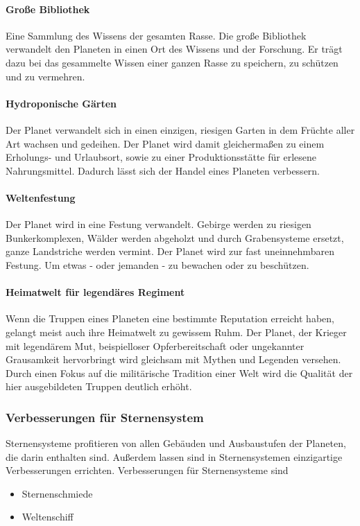 \documentclass[11pt, a4paper]{article}
\begin{document}
\paragraph{Große Bibliothek}
Eine Sammlung des Wissens der gesamten Rasse. Die große Bibliothek verwandelt den Planeten in einen Ort des
Wissens und der Forschung. Er trägt dazu bei das gesammelte Wissen einer ganzen Rasse zu speichern, zu schützen
und zu vermehren.
%
\paragraph{Hydroponische Gärten}
Der Planet verwandelt sich in einen einzigen, riesigen Garten in dem Früchte aller Art wachsen und gedeihen.
Der Planet wird damit gleichermaßen zu einem Erholungs- und Urlaubsort, sowie zu einer Produktionsstätte für
erlesene Nahrungsmittel. Dadurch lässt sich der Handel eines Planeten verbessern.
%
\paragraph{Weltenfestung}
Der Planet wird in eine Festung verwandelt. Gebirge werden zu riesigen Bunkerkomplexen, Wälder werden abgeholzt
und durch Grabensysteme ersetzt, ganze Landstriche werden vermint. Der Planet wird zur fast uneinnehmbaren
Festung. Um etwas - oder jemanden - zu bewachen oder zu beschützen.
%
\paragraph{Heimatwelt für legendäres Regiment}
Wenn die Truppen eines Planeten eine bestimmte Reputation erreicht haben, gelangt meist auch ihre Heimatwelt
zu gewissem Ruhm. Der Planet, der Krieger mit legendärem Mut, beispielloser Opferbereitschaft oder ungekannter
Grausamkeit hervorbringt wird gleichsam mit Mythen und Legenden versehen. Durch einen Fokus auf die
militärische Tradition einer Welt wird die Qualität der hier ausgebildeten Truppen deutlich erhöht.
%
\subsubsection{Verbesserungen für Sternensystem}
Sternensysteme profitieren von allen Gebäuden und Ausbaustufen der Planeten, die darin enthalten sind.
Außerdem lassen sind in Sternensystemen einzigartige Verbesserungen errichten.
Verbesserungen für Sternensysteme sind
\begin{itemize}
	\item Sternenschmiede
	\item Weltenschiff
\end{itemize}
%
\end{document}
